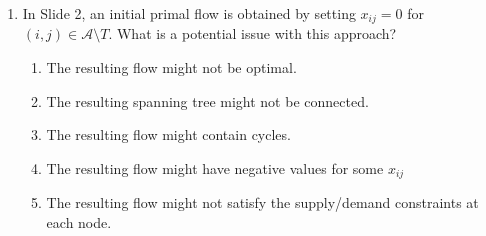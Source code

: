 \documentclass{article}%
\begin{document}
\begin{enumerate}
\begin{enumerate}
\item A spanning tree provides a convenient way to visualize the network, but it doesn't directly impact the algorithm's efficiency.%
\item The spanning tree ensures that the network is connected, preventing disconnected components that would hinder the optimization process.%
\item A spanning tree defines a basis for the linear program representing the network flow problem, allowing for efficient updates during simplex iterations.%
\item The spanning tree guarantees that the initial solution is feasible, eliminating the need for Phase I of the simplex method.%
\item A spanning tree simplifies the calculation of the objective function, but it doesn't affect the feasibility or optimality of the solution.%
\end{enumerate}%
\vspace{1em}%
\item In Slide 2, an initial primal flow is obtained by setting $x_{ij} = 0$ for $(i, j) \in \mathcal{A} \setminus T$. What is a potential issue with this approach?%
\begin{enumerate}%
\item The resulting flow might not be optimal.%
\item The resulting spanning tree might not be connected.%
\item The resulting flow might contain cycles.%
\item The resulting flow might have negative values for some $x_{ij}$%
\item The resulting flow might not satisfy the supply/demand constraints at each node.%
\end{enumerate}%
\vspace{1em}%
\end{enumerate}

%
\newpage%
\end{document}
